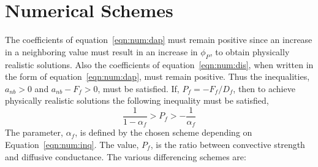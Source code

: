 \section{Numerical Schemes}

The coefficients of equation~\eqref{eqn:num:dap} must remain positive
since an increase in a neighboring value must result in an increase
in $\phi_P$, to obtain physically realistic solutions. Also the
coefficients of equation~\eqref{eqn:num:dis}, when written in the form
of equation~\eqref{eqn:num:dap}, must remain positive. Thus the
inequalities, $a_{nb} > 0$ and $a_{nb} - F_f>0$, must be satisfied.  If,
$P_f = -F_f / D_f$, then to achieve physically realistic solutions the
following inequality must be satisfied,
\begin{equation}
\frac{1}{1-\alpha_f} > P_f > -\frac{1}{\alpha_f}
\label{eqn:num:inq}
\end{equation}
The parameter, $\alpha_f$, is defined by the chosen scheme depending
on Equation~\eqref{eqn:num:inq}. The value, $P_f$, is the ratio between
convective strength and diffusive conductance. The various
differencing schemes are:
